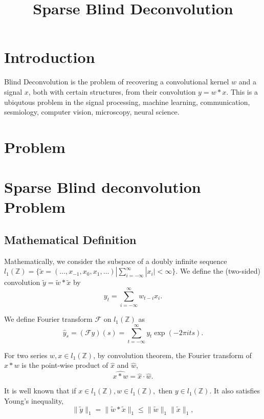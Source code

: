 \documentclass[letter, 10pt]{article}
\title{Sparse Blind Deconvolution}
\numberwithin{equation}{section}
\begin{document}
\maketitle

\vspace{-0.3in}

\section{Introduction}
Blind Deconvolution is the problem of recovering a convolutional kernel $w$ and a signal $x$, both with certain structures, from their convolution $y=w*x$. This is a ubiqutous problem in the signal processing, machine learning, communication, sesmiology, computer vision, microscopy, neural science. 


\section{Problem}



\section{Sparse Blind deconvolution Problem}
\subsection{Mathematical Definition}
Mathematically, we consider the subspace of a doubly infinite sequence $l_1( \mathbb{Z})=\{\tilde x=(\ldots, x_{-1}, x_0, x_1, \ldots)| \sum_{i=-\infty}^{\infty}|x_i| < \infty\}$. 
We define the (two-sided) convolution 
$\tilde y=\tilde w*\tilde x$ by 
$$y_t = \sum_{i=-\infty}^{\infty}w_{t-i}x_i.$$

We define Fourier transform $\mathcal F$ on $l_1( \mathbb{Z})$
as $$ \hat y_s = (\mathcal F y)(s) = \sum_{t =-\infty}^\infty y_t 
    \exp \left( -2\pi i ts \right).$$

For two series $w, x \in l_1( \mathbb{Z})$, by convolution theorem, the Fourier transform of $x*w$ is the point-wise product of $\hat x$ and $\hat w$,
$$ \widehat{x*w} = \hat x \cdot \hat w.$$


It is well known that if $x\in l_1( \mathbb{Z}), w\in  l_1( \mathbb{Z}),$ then $y\in l_1( \mathbb{Z})$. It also satisfies Young's inequality, 
$$\|\tilde y\|_1=\|\tilde w*\tilde x\|_1 \leq \|\tilde w \|_1 \|\tilde x\|_1, $$
\end{document}
